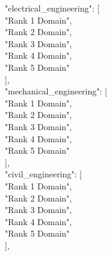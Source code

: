 \begin{tcolorbox}[
    colback=gray!5,
    colframe=gray!40,
    boxrule=0.4pt,
    arc=2pt,
    left=6pt,
    right=6pt,
    top=6pt,
    bottom=6pt,
    breakable
]
\vspace{2pt}
\hspace*{1em}"electrical\_engineering": [\\
\hspace*{2em}"Rank 1 Domain",\\
\hspace*{2em}"Rank 2 Domain",\\
\hspace*{2em}"Rank 3 Domain",\\
\hspace*{2em}"Rank 4 Domain",\\
\hspace*{2em}"Rank 5 Domain"\\
\hspace*{1em}],\\

\vspace{2pt}
\hspace*{1em}"mechanical\_engineering": [\\
\hspace*{2em}"Rank 1 Domain",\\
\hspace*{2em}"Rank 2 Domain",\\
\hspace*{2em}"Rank 3 Domain",\\
\hspace*{2em}"Rank 4 Domain",\\
\hspace*{2em}"Rank 5 Domain"\\
\hspace*{1em}],\\

\vspace{2pt}
\hspace*{1em}"civil\_engineering": [\\
\hspace*{2em}"Rank 1 Domain",\\
\hspace*{2em}"Rank 2 Domain",\\
\hspace*{2em}"Rank 3 Domain",\\
\hspace*{2em}"Rank 4 Domain",\\
\hspace*{2em}"Rank 5 Domain"\\
\hspace*{1em}],\\


\end{tcolorbox}
